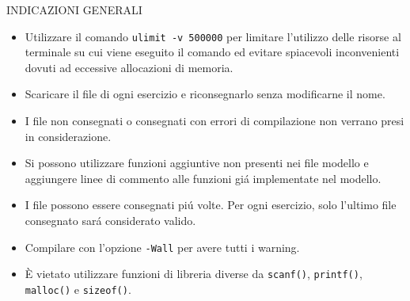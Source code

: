 \noindent\makebox[\linewidth]{\rule{\linewidth}{0.4pt}}
\begin{center}
INDICAZIONI GENERALI
\end{center}
\begin{itemize}
\item{Utilizzare il comando \texttt{ulimit -v 500000} per limitare l'utilizzo delle risorse al terminale su cui viene eseguito il comando ed evitare spiacevoli inconvenienti dovuti ad eccessive allocazioni di memoria.}
\item{Scaricare il file di ogni esercizio e riconsegnarlo senza modificarne il nome.}
\item{I file non consegnati o consegnati con errori di compilazione non verrano presi in considerazione. }
\item{Si possono utilizzare funzioni aggiuntive non presenti nei file modello e aggiungere linee di commento alle funzioni gi\'a implementate nel modello.}
\item{I file possono essere consegnati pi\'u volte. Per ogni esercizio, solo l'ultimo file consegnato sar\'a considerato valido.}
\item{Compilare con l'opzione \texttt{-Wall} per avere tutti i warning.}
\item {È vietato utilizzare funzioni di libreria diverse da \texttt{scanf()}, \texttt{printf()}, \texttt{malloc()} e \texttt{sizeof()}.}
\end{itemize}
\noindent\makebox[\linewidth]{\rule{\linewidth}{0.4pt}}
